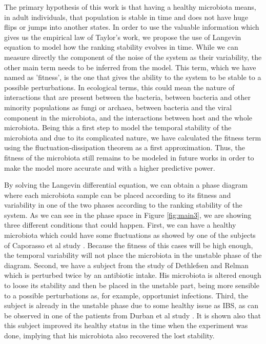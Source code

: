 The primary hypothesis of this work is that having a healthy microbiota means, in adult individuals, that population is stable in time and does not have huge flips or jumps into another states. In order to use the valuable information which gives us the empirical law of Taylor's work, we propose the use of Langevin equation to model how the ranking stability evolves in time. While we can measure directly the component of the noise of the system as their variability, the other main term needs to be inferred from the model. This term, which we have named as 'fitness', is the one that gives the ability to the system to be stable to a possible perturbations. In ecological terms, this could mean the nature of interactions that are present between the bacteria, between bacteria and other minority populations as fungi or archaea, between bacteria and the viral component in the microbiota, and the interactions between host and the whole microbiota. Being this a first step to model the temporal stability of the microbiota and due to its complicated nature, we have calculated the fitness term using the fluctuation-dissipation theorem as a first approximation. Thus, the fitness of the microbiota still remains to be modeled in future works in order to make the model more accurate and with a higher predictive power. 

By solving the Langevin differential equation, we can obtain a phase diagram where each microbiota sample can be placed according to its fitness and variability in one of the two phases according to the ranking stability of the system. As we can see in the phase space in Figure \ref{fig:main3}, we are showing three different conditions that could happen. First, we can have a healthy microbiota which could have some fluctuations as showed by one of the subjects of Caporasso et al study \cite{moving}. Because the fitness of this cases will be high enough, the temporal variability will not place the microbiota in the unstable phase of the diagram. Second, we have a subject from the study of Dethlefsen and Relman \cite{antibiotic} which is perturbed twice by an antibiotic intake. His microbiota is altered enough to loose its stability and then be placed in the unstable part, being more sensible to a possible perturbations as, for example, opportunist infections. Third, the subject is already in the unstable phase due to some healthy issue as IBS, as can be observed in one of the patients from Durban et al study \cite{IBS}. It is shown also that this subject improved its healthy status in the time when the experiment was done, implying that his microbiota also recovered the lost stability. 

